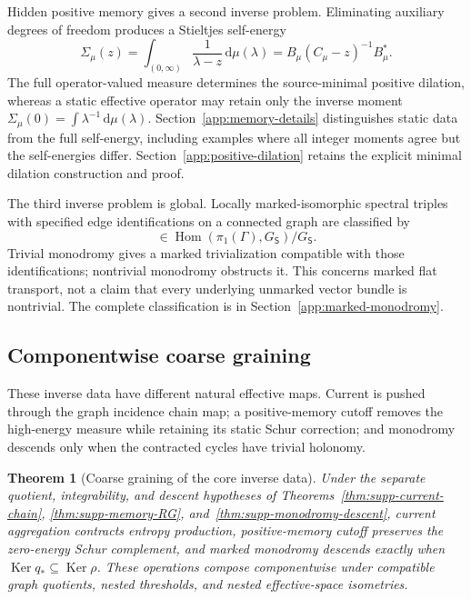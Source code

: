 \documentclass[11pt]{article}
\newtheorem{theorem}{Theorem}[section]
\theoremstyle{definition}
\theoremstyle{remark}
\theoremstyle{definition}
\theoremstyle{remark}
\newcommand{\dd}{\mathrm d}
\newcommand{\Ker}{\operatorname{Ker}}
\newcommand{\Hom}{\operatorname{Hom}}
\begin{document}
Hidden positive memory gives a second inverse problem.  Eliminating auxiliary
degrees of freedom produces a Stieltjes self-energy
\begin{equation}
 \Sigma_\mu(z)=\int_{(0,\infty)}\frac{1}{\lambda-z}\,\dd\mu(\lambda)
             =B_\mu(C_\mu-z)^{-1}B_\mu^*.
 \label{eq:summary-Stieltjes}
\end{equation}
The full operator-valued measure determines the source-minimal positive dilation,
whereas a static effective operator may retain only the inverse moment
$\Sigma_\mu(0)=\int\lambda^{-1}\,\dd\mu(\lambda)$.
Section~\ref{app:memory-details} distinguishes static data from the full
self-energy, including examples where all integer moments agree but the
self-energies differ.  Section~\ref{app:positive-dilation} retains the explicit
minimal dilation construction and proof.

The third inverse problem is global.  Locally marked-isomorphic spectral triples
with specified edge identifications on a connected graph are classified by
\begin{equation}
 [\rho]\in\Hom(\pi_1(\Gamma),G_{\mathsf S})/G_{\mathsf S}.
 \label{eq:summary-monodromy}
\end{equation}
Trivial monodromy gives a marked trivialization compatible with those
identifications; nontrivial monodromy obstructs it.  This concerns marked flat
transport, not a claim that every underlying unmarked vector bundle is
nontrivial.  The complete classification is in Section~\ref{app:marked-monodromy}.

\subsection{Componentwise coarse graining}

These inverse data have different natural effective maps.  Current is pushed
through the graph incidence chain map; a positive-memory cutoff removes the
high-energy measure while retaining its static Schur correction; and monodromy
descends only when the contracted cycles have trivial holonomy.

\begin{theorem}[Coarse graining of the core inverse data]
\label{thm:summary-universality}
Under the separate quotient, integrability, and descent hypotheses of
Theorems~\ref{thm:supp-current-chain}, \ref{thm:supp-memory-RG},
and~\ref{thm:supp-monodromy-descent}, current aggregation contracts entropy
production, positive-memory cutoff preserves the zero-energy Schur complement,
and marked monodromy descends exactly when
$\Ker q_*\subseteq\Ker\rho$.  These operations compose componentwise under
compatible graph quotients, nested thresholds, and nested effective-space
isometries.
\end{theorem}
\end{document}
